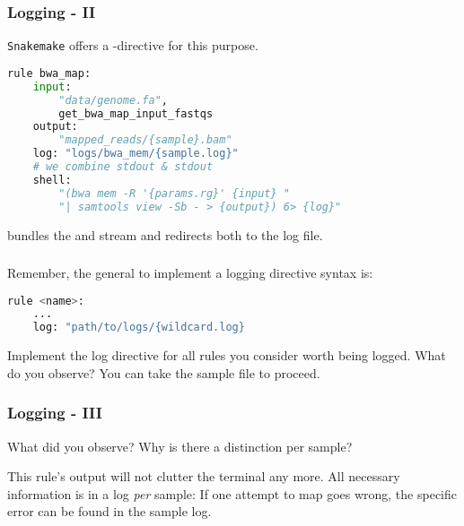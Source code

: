 \begin{frame}[fragile]
  \frametitle{Logging - II}
  \texttt{Snakemake} offers a -directive for this purpose.  
  \begin{lstlisting}[language=Python,style=Python]
rule bwa_map:
    input:
        "data/genome.fa",
        get_bwa_map_input_fastqs
    output:
        "mapped_reads/{sample}.bam"
    log: "logs/bwa_mem/{sample.log}"
    # we combine stdout & stdout
    shell:
        "(bwa mem -R '{params.rg}' {input} "
        "| samtools view -Sb - > {output}) 6> {log}"
   \end{lstlisting}
   \begin{docs}[Background]
     \altverb{&} bundles the  and  stream and \altverb{>} redirects both to the log file. 
   \end{docs}
\end{frame}

\begin{frame}[fragile]
  \frametitle{}
  \begin{task}
  	 Remember, the general to implement a logging directive syntax is:
  	 \begin{lstlisting}[language=Python,style=Python]
rule <name>:
    ...
    log: "path/to/logs/{wildcard.log}
  	\end{lstlisting}
    Implement the log directive for all rules you consider worth being logged. What do you observe?
    \newline
    You can take the  sample file to proceed.
  \end{task}
\end{frame}

\begin{frame}
  \frametitle{Logging - III}
  \begin{question}[Questions]
  	 What did you observe? Why is there a distinction per sample?
  \end{question}
  \pause
  \begin{docs}
  	This rule's output will not clutter the terminal any more. All necessary information is in a log \emph{per} sample: If one attempt to map goes wrong, the specific error can be found in the sample log.
  \end{docs}
\end{frame}

